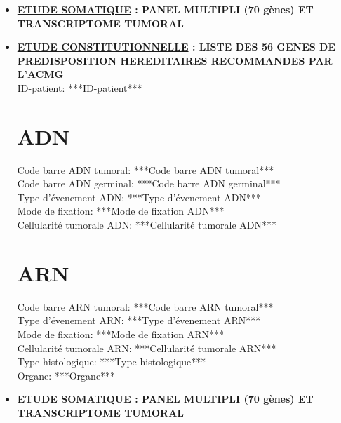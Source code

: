 \documentclass[10pt]{article}
\begin{document}
\begin{itemize}[font=\Large, label=, leftmargin=*, wide = 0pt]
\item \textbf{\underline{ETUDE SOMATIQUE} : PANEL MULTIPLI (70 gènes) ET TRANSCRIPTOME TUMORAL}\\
\item \textbf{\underline{ETUDE CONSTITUTIONNELLE} : LISTE DES 56 GENES DE PREDISPOSITION HEREDITAIRES RECOMMANDES PAR L’ACMG}\\

ID-patient: ***ID-patient***\\


\section*{ADN} 

Code barre ADN tumoral: ***Code barre ADN tumoral*** \\

Code barre ADN germinal: ***Code barre ADN germinal*** \\

Type d'évenement ADN: ***Type d'évenement ADN***\\

Mode de fixation: ***Mode de fixation ADN***\\

Cellularité tumorale ADN: ***Cellularité tumorale ADN***\\


\section*{ARN}

Code barre ARN tumoral: ***Code barre ARN tumoral*** \\

Type d'évenement ARN: ***Type d'évenement ARN***\\

Mode de fixation: ***Mode de fixation ARN***\\

Cellularité tumorale ARN: ***Cellularité tumorale ARN***\\

Type histologique: ***Type histologique***\\
\newline
Organe: ***Organe***

\newpage

\item \textbf{ETUDE SOMATIQUE : PANEL MULTIPLI (70 gènes) ET TRANSCRIPTOME TUMORAL}


\end{itemize}
\end{document}
